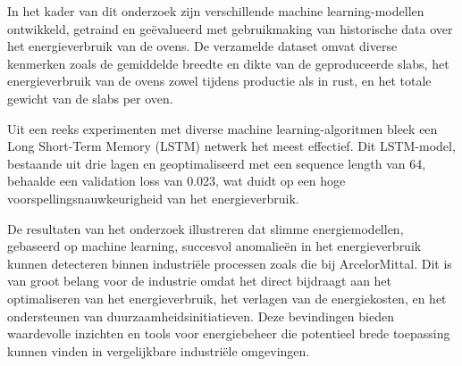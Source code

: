 In het kader van dit onderzoek zijn verschillende machine learning-modellen ontwikkeld, getraind en geëvalueerd met gebruikmaking van historische data over het energieverbruik van de ovens. De verzamelde dataset omvat diverse kenmerken zoals de gemiddelde breedte en dikte van de geproduceerde slabs, het energieverbruik van de ovens zowel tijdens productie als in rust, en het totale gewicht van de slabs per oven.

Uit een reeks experimenten met diverse machine learning-algoritmen bleek een Long Short-Term Memory (LSTM) netwerk het meest effectief. Dit LSTM-model, bestaande uit drie lagen en geoptimaliseerd met een sequence length van 64, behaalde een validation loss van 0.023, wat duidt op een hoge voorspellingsnauwkeurigheid van het energieverbruik.

De resultaten van het onderzoek illustreren dat slimme energiemodellen, gebaseerd op machine learning, succesvol anomalieën in het energieverbruik kunnen detecteren binnen industriële processen zoals die bij ArcelorMittal. Dit is van groot belang voor de industrie omdat het direct bijdraagt aan het optimaliseren van het energieverbruik, het verlagen van de energiekosten, en het ondersteunen van duurzaamheidsinitiatieven. Deze bevindingen bieden waardevolle inzichten en tools voor energiebeheer die potentieel brede toepassing kunnen vinden in vergelijkbare industriële omgevingen.

